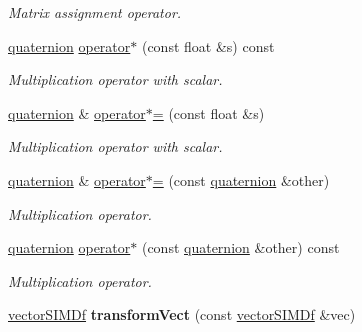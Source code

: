 \begin{DoxyCompactItemize}
\begin{DoxyCompactList}\small\item\em Matrix assignment operator. \end{DoxyCompactList}\item 
\hyperlink{classirr_1_1core_1_1quaternion}{quaternion} \hyperlink{classirr_1_1core_1_1quaternion_abd7459aa54f449019c593d04282c0c99}{operator$\ast$} (const float \&s) const \hypertarget{classirr_1_1core_1_1quaternion_abd7459aa54f449019c593d04282c0c99}{}\label{classirr_1_1core_1_1quaternion_abd7459aa54f449019c593d04282c0c99}

\begin{DoxyCompactList}\small\item\em Multiplication operator with scalar. \end{DoxyCompactList}\item 
\hyperlink{classirr_1_1core_1_1quaternion}{quaternion} \& \hyperlink{classirr_1_1core_1_1quaternion_a6048ee0ff617cda80eb2e160c444784f}{operator$\ast$=} (const float \&s)\hypertarget{classirr_1_1core_1_1quaternion_a6048ee0ff617cda80eb2e160c444784f}{}\label{classirr_1_1core_1_1quaternion_a6048ee0ff617cda80eb2e160c444784f}

\begin{DoxyCompactList}\small\item\em Multiplication operator with scalar. \end{DoxyCompactList}\item 
\hyperlink{classirr_1_1core_1_1quaternion}{quaternion} \& \hyperlink{classirr_1_1core_1_1quaternion_acfc5a94312c9f569d9b0d50c954dfcc0}{operator$\ast$=} (const \hyperlink{classirr_1_1core_1_1quaternion}{quaternion} \&other)\hypertarget{classirr_1_1core_1_1quaternion_acfc5a94312c9f569d9b0d50c954dfcc0}{}\label{classirr_1_1core_1_1quaternion_acfc5a94312c9f569d9b0d50c954dfcc0}

\begin{DoxyCompactList}\small\item\em Multiplication operator. \end{DoxyCompactList}\item 
\hyperlink{classirr_1_1core_1_1quaternion}{quaternion} \hyperlink{classirr_1_1core_1_1quaternion_a740a2885a20005a62e8f24dffa1d48c7}{operator$\ast$} (const \hyperlink{classirr_1_1core_1_1quaternion}{quaternion} \&other) const \hypertarget{classirr_1_1core_1_1quaternion_a740a2885a20005a62e8f24dffa1d48c7}{}\label{classirr_1_1core_1_1quaternion_a740a2885a20005a62e8f24dffa1d48c7}

\begin{DoxyCompactList}\small\item\em Multiplication operator. \end{DoxyCompactList}\item 
\hyperlink{classirr_1_1core_1_1vectorSIMDf}{vector\+S\+I\+M\+Df} {\bfseries transform\+Vect} (const \hyperlink{classirr_1_1core_1_1vectorSIMDf}{vector\+S\+I\+M\+Df} \&vec)\hypertarget{classirr_1_1core_1_1quaternion_aa0e9e62b3c65456b1bfd84650c07bd76}{}\label{classirr_1_1core_1_1quaternion_aa0e9e62b3c65456b1bfd84650c07bd76}


\end{DoxyCompactItemize}
